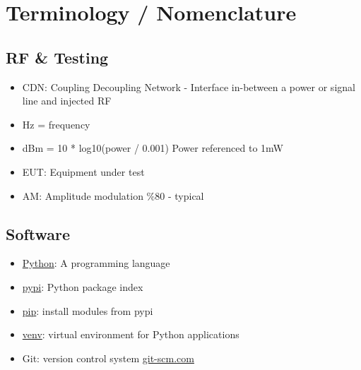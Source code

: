 \section{Terminology  /  Nomenclature}


\subsection{RF \& Testing}
\begin{itemize}
\item CDN: Coupling Decoupling Network - Interface in-between a power or signal line and injected RF
\item Hz = frequency
\item dBm = 10 * log10(power / 0.001) Power referenced to 1mW
\item EUT: Equipment under test
\item AM: Amplitude modulation \%80 - typical
\end{itemize}

\subsection{Software}
\begin{itemize}
\item \href{https://www.python.org/}{Python}: A programming language
\item \href{https://pypi.python.org/pypi}{pypi}: Python package index
\item \href{https://pypi.python.org/pypi/pip}{pip}: install modules from pypi
\item \href{https://docs.python.org/3/library/venv.html}{venv}: virtual environment for Python applications
\item Git: version control system \href{https://git-scm.com}{git-scm.com}
\end{itemize}
